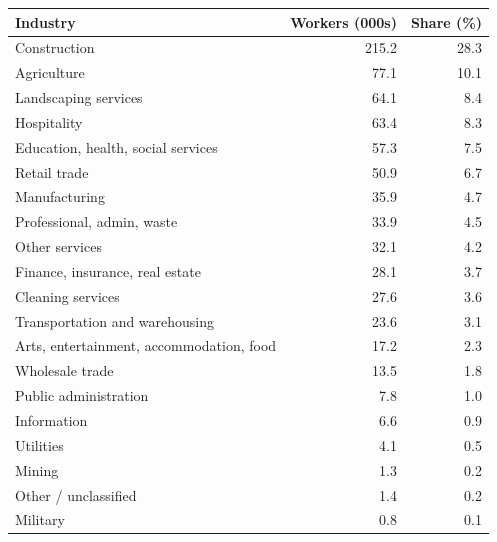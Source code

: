 
\begin{tabular}{lrr}
\toprule
Industry & Workers (000s) & Share (\%)\\
\midrule
Construction & 215.2 & 28.3\\
Agriculture & 77.1 & 10.1\\
Landscaping services & 64.1 & 8.4\\
Hospitality & 63.4 & 8.3\\
Education, health, social services & 57.3 & 7.5\\
Retail trade & 50.9 & 6.7\\
Manufacturing & 35.9 & 4.7\\
Professional, admin, waste & 33.9 & 4.5\\
Other services & 32.1 & 4.2\\
Finance, insurance, real estate & 28.1 & 3.7\\
Cleaning services & 27.6 & 3.6\\
Transportation and warehousing & 23.6 & 3.1\\
Arts, entertainment, accommodation, food & 17.2 & 2.3\\
Wholesale trade & 13.5 & 1.8\\
Public administration & 7.8 & 1.0\\
Information & 6.6 & 0.9\\
Utilities & 4.1 & 0.5\\
Mining & 1.3 & 0.2\\
Other / unclassified & 1.4 & 0.2\\
Military & 0.8 & 0.1\\
\bottomrule
\end{tabular}
